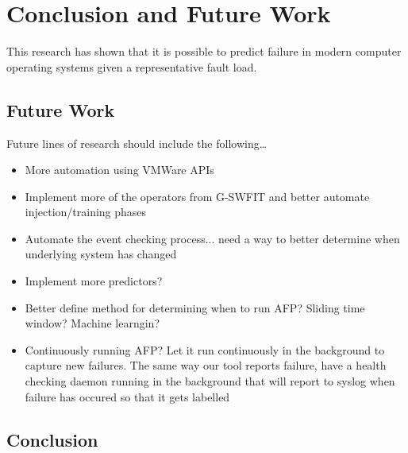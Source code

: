 \chapter{Conclusion and Future Work} \label{chapter5}
This research has shown that it is possible to predict failure in modern
computer operating systems given a representative fault load.

\section{Future Work}
Future lines of research should include the following\dots

\begin{itemize}
\item{More automation using VMWare APIs}
\item{Implement more of the operators from G-SWFIT and better automate
injection/training phases}
\item{Automate the event checking process... need a way to better determine
when underlying system has changed}
\item{Implement more predictors?}
\item{Better define method for determining when to run AFP? Sliding time
window?  Machine learngin?}
\item{Continuously running AFP?  Let it run continuously in the background to
capture new failures.  The same way our tool reports failure, have a health
checking daemon running in the background that will report to syslog when
failure has occured so that it gets labelled}
\end{itemize}

\section{Conclusion}
